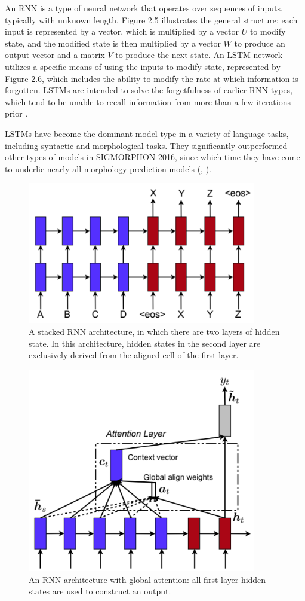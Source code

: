 An RNN is a type of neural network that operates over sequences of inputs, typically with unknown length. Figure 2.5 illustrates the general structure: each input is represented by a vector, which is multiplied by a vector $U$ to modify state, and the modified state is then multiplied by a vector $W$ to produce an output vector and a matrix $V$ to produce the next state. An LSTM network utilizes a specific means of using the inputs to modify state, represented by Figure 2.6, which includes the ability to modify the rate at which information is forgotten. LSTMs are intended to solve the forgetfulness of earlier RNN types, which tend to be unable to recall information from more than a few iterations prior \parencite{Hochreiter1997}.

LSTMs have become the dominant model type in a variety of language tasks, including syntactic and morphological tasks. They significantly outperformed other types of models in SIGMORPHON 2016, since which time they have come to underlie nearly all morphology prediction models (\cite{Cotterell2016}, \cite{Cotterell2017a}).

\begin{figure}[ht]
\includegraphics[width=10cm]{images/stacked.png}
\centering
\caption{A stacked RNN architecture, in which there are two layers of hidden state. In this architecture, hidden states in the second layer are exclusively derived from the aligned cell of the first layer. \parencite{Luong2015}}
\end{figure}

\begin{figure}[p]
\includegraphics[width=10cm]{images/global.png}
\centering
\caption{An RNN architecture with global attention: all first-layer hidden states are used to construct an output. \parencite{Luong2015}}
\end{figure}

